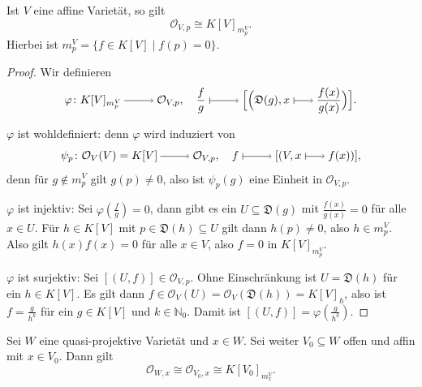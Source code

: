 \documentclass[a4paper,12pt]{scrbook}
\theoremstyle{keinenummern} %
\theoremstyle{mitnummern}
\theoremstyle{unserbeweis}
\newtheorem{proof}{Beweis}
\def\O{\mathcal{O}}
\newcommand{\D}{\mathfrak{D}}
\renewcommand{\phi}{\varphi}
\newcommand{\set}[1]{\ensuremath{\mathbb{#1}}}
\newcommand{\N}{\set{N}}
\newcommand{\smapsto}{\raisebox{-1pt}{\tikz{\draw[thin,shorten >=3pt, |->] (0,0) node{\hspace*{0pt}} -- node{} (0.7,0);}}\penalty1000\relax}
\newcommand{\ra}{\raisebox{-1pt}{\tikz{\draw[thin,shorten >=3pt, ->] (0,0) node{\hspace*{-2pt}} -- node{} (1,0);}}\penalty1000\relax}
\renewcommand{\mapsto}{\raisebox{-1pt}{\tikz{\draw[thin,shorten >=3pt, |->] (0,0) node{\hspace*{0pt}} -- node{} (1,0);}}\penalty1000\relax}
\begin{document}
\begin{prop}\label{3.1.5}
  Ist $V$ eine affine Varietät, so gilt \[ \O_{V,p}\cong K[V]_{m_p^V}. \]
  Hierbei ist $m_p^V = \{ f\in K[V] \mid f(p)=0\}$.
\end{prop}
\begin{proof}
  Wir definieren
  \[ \phi\colon K[V]_{m_p^V}\ra\O_{V,p},\quad\frac{f}{g}\mapsto\Bigl[\Bigl(\D(g),x\smapsto\frac{f(x)}{g(x)}\Bigr)\Bigr]. \]

  $\phi$ ist wohldefiniert: denn $\phi$ wird induziert von
  \[ \psi_p\colon \O_V(V)=K[V]\ra\O_{V,p},\quad f\mapsto[(V,x\smapsto f(x))], \]
  denn für $g\notin m_p^V$ gilt $g(p)\neq0$, also ist $\psi_p(g)$ eine Einheit in $\O_{V,p}$.

  $\phi$ ist injektiv: Sei $\phi(\frac{f}{g})=0$, dann gibt es ein $U\subseteq\D(g)$ mit $\frac{f(x)}{g(x)}=0$ für alle $x\in
  U$. Für $h\in K[V]$ mit $p\in\D(h)\subseteq U$ gilt dann $h(p)\neq0$, also $h\in m_p^V$. Also gilt $h(x)f(x)=0$ für alle
  $x\in V$, also $f=0$ in $K[V]_{m_p^V}$.

  $\phi$ ist surjektiv: Sei $[(U,f)]\in\O_{V,p}$. Ohne Einschränkung ist $U=\D(h)$ für ein $h\in K[V]$. Es gilt dann
  $f\in\O_V(U)=\O_V(\D(h))=K[V]_h$, also ist $f=\frac{g}{h^k}$ für ein $g\in K[V]$ und $k\in\N_0$. Damit ist
  $[(U,f)]=\phi(\frac{g}{h^k})$.  
\end{proof}

\begin{kor}\label{3.1.6}
  Sei $W$ eine quasi-projektive Varietät und $x\in W$. Sei weiter $V_0\subseteq W$ offen und affin mit $x\in V_0$. Dann gilt
  \[ \O_{W,x} \cong \O_{V_0,x} \cong K[V_0]_{m_x^V}. \]
\end{kor}
\end{document}
